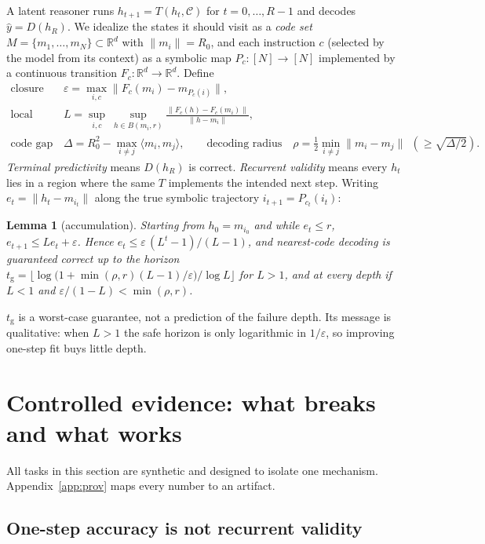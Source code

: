 \documentclass[11pt]{article}
\newtheorem{lemma}[theorem]{Lemma}
\theoremstyle{definition}
\theoremstyle{remark}
\newcommand{\R}{\mathbb{R}}
\newcommand{\norm}[1]{\lVert #1\rVert}
\newcommand{\ip}[2]{\langle #1, #2\rangle}
\begin{document}
A latent reasoner runs $h_{t+1}=T(h_t,\mathcal C)$ for $t=0,\dots,R-1$ and decodes
$\hat y=D(h_R)$. We idealize the states it should visit as a \emph{code set}
$M=\{m_1,\dots,m_N\}\subset\R^d$ with $\norm{m_i}=R_0$, and each instruction $c$ (selected by the
model from its context) as a symbolic map $P_c:[N]\to[N]$ implemented by a continuous transition
$F_c:\R^d\to\R^d$. Define
\begin{align*}
\text{closure defect}\quad &\varepsilon=\max_{i,c}\norm{F_c(m_i)-m_{P_c(i)}},\\
\text{local gain}\quad &L=\sup_{i,c}\ \sup_{h\in B(m_i,r)}\frac{\norm{F_c(h)-F_c(m_i)}}{\norm{h-m_i}},\\
\text{code gap}\quad &\Delta=R_0^2-\max_{i\neq j}\ip{m_i}{m_j},\qquad
\text{decoding radius}\quad \rho=\tfrac12\min_{i\ne j}\norm{m_i-m_j}\ \ (\ge\sqrt{\Delta/2}).
\end{align*}
\emph{Terminal predictivity} means $D(h_R)$ is correct. \emph{Recurrent validity} means every
$h_t$ lies in a region where the same $T$ implements the intended next step. Writing
$e_t=\norm{h_t-m_{i_t}}$ along the true symbolic trajectory $i_{t+1}=P_{c_t}(i_t)$:

\begin{lemma}[accumulation]\label{lem:acc}
Starting from $h_0=m_{i_0}$ and while $e_t\le r$, $e_{t+1}\le Le_t+\varepsilon$. Hence $e_t\le\varepsilon\,(L^t-1)/(L-1)$, and
nearest-code decoding is guaranteed correct up to the horizon
$t_{\mathrm{g}}=\big\lfloor\log\!\big(1+\min(\rho,r)(L-1)/\varepsilon\big)/\log L\big\rfloor$ for
$L>1$, and at every depth if $L<1$ and $\varepsilon/(1-L)<\min(\rho,r)$.
\end{lemma}

$t_{\mathrm g}$ is a worst-case guarantee, not a prediction of the failure depth. Its message is
qualitative: when $L>1$ the safe horizon is only logarithmic in $1/\varepsilon$, so improving
one-step fit buys little depth.

\section{Controlled evidence: what breaks and what works}\label{sec:evidence}

All tasks in this section are synthetic and designed to isolate one mechanism. Appendix~\ref{app:prov}
maps every number to an artifact.

\subsection{One-step accuracy is not recurrent validity}
\end{document}
